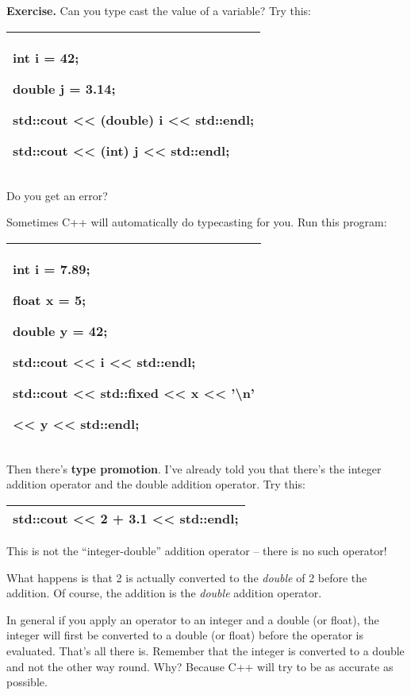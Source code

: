 \documentclass[
]{article}
\begin{document}
\textbf{Exercise.} Can you type cast the value of a variable? Try this:

\begin{longtable}[]{@{}l@{}}
\toprule
\endhead
\begin{minipage}[t]{0.97\columnwidth}\raggedright
int i = 42;

double j = 3.14;

std::cout \textless\textless{} (double) i \textless\textless{}
std::endl;

std::cout \textless\textless{} (int) j \textless\textless{}
std::endl;\strut
\end{minipage}\tabularnewline
\bottomrule
\end{longtable}

Do you get an error?

Sometimes C++ will automatically do typecasting for you. Run this
program:

\begin{longtable}[]{@{}l@{}}
\toprule
\endhead
\begin{minipage}[t]{0.97\columnwidth}\raggedright
int i = 7.89;

float x = 5;

double y = 42;

std::cout \textless\textless{} i \textless\textless{} std::endl;

std::cout \textless\textless{} std::fixed \textless\textless{} x
\textless\textless{} '\textbackslash n'

\textless\textless{} y \textless\textless{} std::endl;\strut
\end{minipage}\tabularnewline
\bottomrule
\end{longtable}

Then there's \textbf{type promotion}. I've already told you that there's
the integer addition operator and the double addition operator. Try
this:

\begin{longtable}[]{@{}l@{}}
\toprule
\endhead
std::cout \textless\textless{} 2 + 3.1 \textless\textless{}
std::endl;\tabularnewline
\bottomrule
\end{longtable}

This is not the ``integer-double'' addition operator -- there is no such
operator!

What happens is that 2 is actually converted to the \emph{double} of 2
before the addition. Of course, the addition is the \emph{double}
addition operator.

In general if you apply an operator to an integer and a double (or
float), the integer will first be converted to a double (or float)
before the operator is evaluated. That's all there is. Remember that the
integer is converted to a double and not the other way round. Why?
Because C++ will try to be as accurate as possible.
\end{document}
